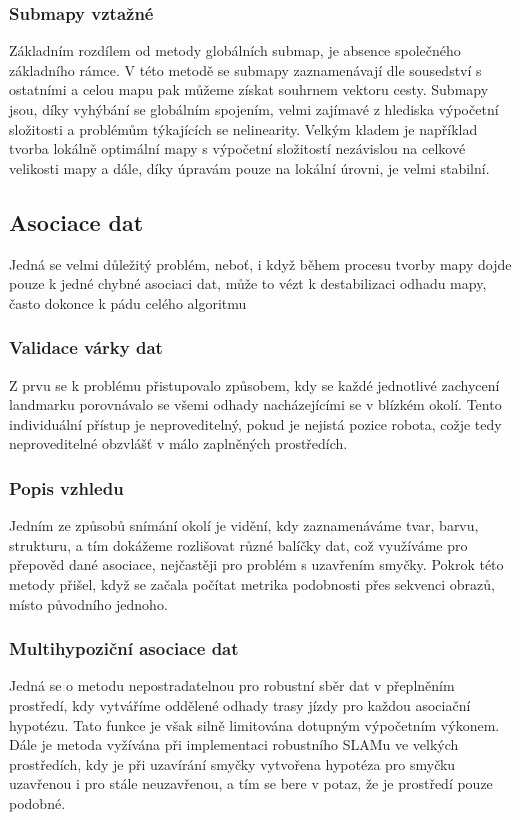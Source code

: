 \documentclass[11pt]{article}
\begin{document}
\subsubsection{Submapy vztažné}
Základním rozdílem od metody globálních submap, je absence společného základního rámce. V této metodě se submapy zaznamenávají dle sousedství s ostatními a celou mapu pak můžeme získat souhrnem vektoru cesty. Submapy jsou, díky vyhýbání se globálním spojením, velmi zajímavé z hlediska výpočetní složitosti a problémům týkajících se nelinearity. Velkým kladem je například tvorba lokálně optimální mapy s výpočetní složitostí nezávislou na celkové velikosti mapy a dále, díky úpravám pouze na lokální úrovni, je velmi stabilní.


\subsection{Asociace dat}
Jedná se velmi důležitý problém, neboť, i když během procesu tvorby mapy dojde pouze k jedné chybné asociaci dat, může to vézt k destabilizaci odhadu mapy, často dokonce k pádu celého algoritmu

\subsubsection{Validace várky dat}
Z prvu se k problému přistupovalo způsobem, kdy se každé jednotlivé zachycení landmarku porovnávalo se všemi odhady nacházejícími se v blízkém okolí. Tento individuální přístup je neproveditelný, pokud je nejistá pozice robota, cožje tedy neproveditelné obzvlášť v málo zaplněných prostředích. 

\subsubsection{Popis vzhledu}
Jedním ze způsobů snímání okolí je vidění, kdy zaznamenáváme tvar, barvu, strukturu, a tím dokážeme rozlišovat různé balíčky dat, což využíváme pro přepověd dané asociace, nejčastěji pro problém s uzavřením smyčky. Pokrok této metody přišel, když se začala počítat metrika podobnosti přes sekvenci obrazů, místo původního jednoho. 

\subsubsection{Multihypoziční asociace dat}
Jedná se o metodu nepostradatelnou pro robustní sběr dat v přeplněním prostředí, kdy vytváříme oddělené odhady trasy jízdy pro každou asociační hypotézu. Tato funkce je však silně limitována dotupným výpočetním výkonem. Dále je metoda vyžívána při implementaci robustního SLAMu ve velkých prostředích, kdy je při uzavírání smyčky vytvořena hypotéza pro smyčku uzavřenou i pro stále neuzavřenou, a tím se bere v potaz, že je prostředí pouze podobné. 
\end{document}
